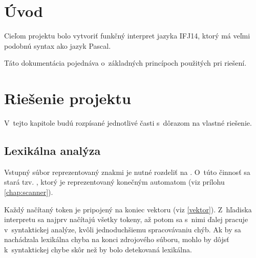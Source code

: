 \documentclass[12pt,a4paper,titlepage,final]{article}
\begin{document}

\def\author{TODO}
\def\email{xloginXX@stud.fit.vutbr.cz}
\def\projname{Interpret jazyka IFJ14}



\pagestyle{plain}
\setcounter{page}{1}
\tableofcontents

\newpage
\pagestyle{plain}
\setcounter{page}{1}

\section{Úvod} \label{uvod}

Cieľom projektu bolo vytvoriť funkčný interpret jazyka IFJ14, ktorý má veľmi
 podobnú syntax ako jazyk Pascal.

Táto dokumentácia pojednáva o~základných princípoch použitých pri riešení.


\section{Riešenie projektu} \label{riesenie}
V~tejto kapitole budú rozpísané jednotlivé časti s~dôrazom na vlastné riešenie.

\subsection{Lexikálna analýza}
Vstupný súbor reprezentovaný znakmi je nutné rozdeliť na .
O~túto činnosť sa stará tzv. , ktorý je reprezentovaný konečným
automatom (viz prílohu \ref{chap:scanner}).

Každý načítaný token je pripojený na koniec vektoru (viz \ref{vektor}).
Z~hľadiska interpretu sa najprv načítajú všetky tokeny, až potom sa s~nimi 
ďalej pracuje v~syntaktickej
analýze, kvôli jednoduchšiemu spracovávaniu chýb. Ak by sa nachádzala
 lexikálna chyba na konci zdrojového súboru, mohlo by dôjsť k~syntaktickej chybe
 skôr než by bolo detekovaná lexikálna.
\end{document}
